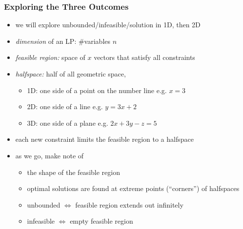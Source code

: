 \documentclass{beamer}
\begin{document}
\begin{frame} \frametitle{Exploring the Three Outcomes}
\begin{itemize}
  \item we will explore unbounded/infeasible/solution in 1D, then 2D
  \item \emph{dimension} of an LP: \#variables $n$
  \item \emph{feasible region:} space of $x$ vectors that satisfy all constraints
  \item \emph{halfspace:} half of all geometric space,
    \begin{itemize}
      \item 1D: one side of a point on the number line e.g. $x=3$
      \item 2D: one side of a line e.g. $y=3x+2$
      \item 3D: one side of a plane e.g. $2x+3y-z=5$
    \end{itemize}
  \item each new constraint limits the feasible region to a halfspace
  \item as we go, make note of
  \begin{itemize}
    \item the shape of the feasible region
    \item optimal solutions are found at extreme points (``corners'') of halfspaces
    \item unbounded $\Leftrightarrow$ feasible region extends out infinitely
    \item infeasible $\Leftrightarrow$ empty feasible region
  \end{itemize}
\end{itemize}
\end{frame}
\end{document}
